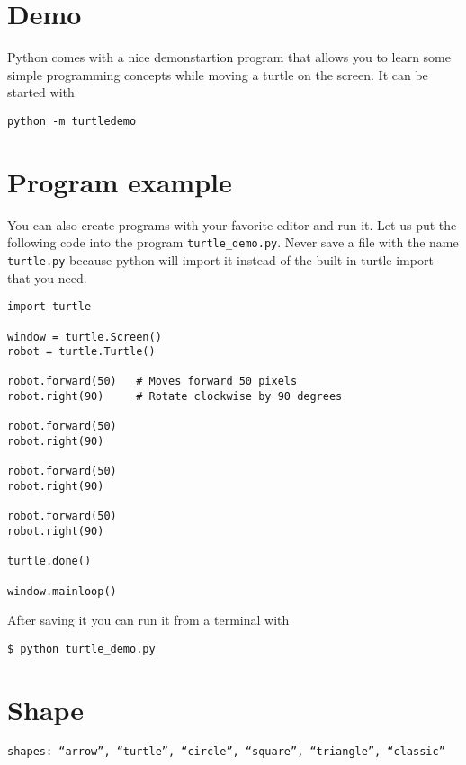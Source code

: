 

\label{turtle-graphics}
\FILENAME

\section{Demo}\label{demo}

Python comes with a nice demonstartion program that allows you to learn
some simple programming concepts while moving a turtle on the screen. It
can be started with

\begin{verbatim}
python -m turtledemo
\end{verbatim}

\section{Program example}\label{program-example}

You can also create programs with your favorite editor and run it. Let
us put the following code into the program \texttt{turtle\_demo.py}.
Never save a file with the name \texttt{turtle.py} because python will
import it instead of the built-in turtle import that you need.

\begin{verbatim}
import turtle

window = turtle.Screen() 
robot = turtle.Turtle() 

robot.forward(50)   # Moves forward 50 pixels
robot.right(90)     # Rotate clockwise by 90 degrees

robot.forward(50)
robot.right(90)

robot.forward(50)
robot.right(90)

robot.forward(50)
robot.right(90)

turtle.done()

window.mainloop()
\end{verbatim}

After saving it you can run it from a terminal with

\begin{verbatim}
$ python turtle_demo.py
\end{verbatim}

\section{Shape}\label{shape}

\begin{verbatim}
shapes: “arrow”, “turtle”, “circle”, “square”, “triangle”, “classic”
\end{verbatim}

